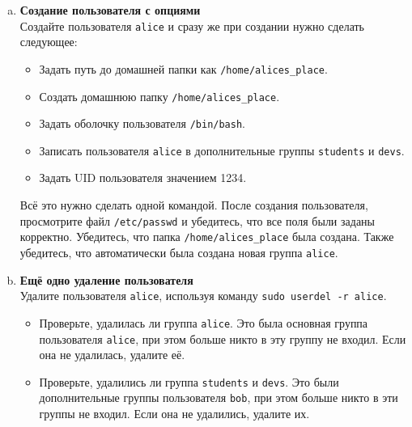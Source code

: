 \documentclass{article}
\begin{document}
\begin{enumerate}[a.]
\item \textbf{Создание пользователя с опциями}\\
Создайте пользователя \texttt{alice} и сразу же при создании нужно сделать следующее:
\begin{itemize}
\item Задать путь до домашней папки как \texttt{/home/alices\_place}.
\item Создать домашнюю папку \texttt{/home/alices\_place}.
\item Задать оболочку пользователя \texttt{/bin/bash}.
\item Записать пользователя \texttt{alice} в дополнительные группы \texttt{students} и \texttt{devs}.
\item Задать UID пользователя значением 1234.
\end{itemize}
Всё это нужно сделать одной командой. После создания пользователя, просмотрите файл \texttt{/etc/passwd} и убедитесь, что все поля были заданы корректно. Убедитесь, что папка \texttt{/home/alices\_place} была создана. Также убедитесь, что автоматически была создана новая группа \texttt{alice}. 

\item \textbf{Ещё одно удаление пользователя}\\
Удалите пользователя \texttt{alice}, используя команду \texttt{sudo userdel -r alice}.
\begin{itemize}
\item Проверьте, удалилась ли группа \texttt{alice}. Это была основная группа пользователя \texttt{alice}, при этом больше никто в эту группу не входил. Если она не удалилась, удалите её.
\item Проверьте, удалились ли группа \texttt{students} и \texttt{devs}. Это были дополнительные группы пользователя \texttt{bob}, при этом больше никто в эти группы не входил. Если она не удалились, удалите их.
\end{itemize}

\end{enumerate}
\end{document}
